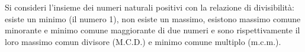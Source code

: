 \begin{example}
    Si consideri l’insieme dei numeri naturali positivi con la relazione di divisibilità: esiste un minimo (il numero 1), non esiste un massimo, esistono massimo comune minorante e minimo comune maggiorante di due numeri e sono rispettivamente il loro massimo comun divisore (M.C.D.) e minimo comune multiplo (m.c.m.).
\end{example}